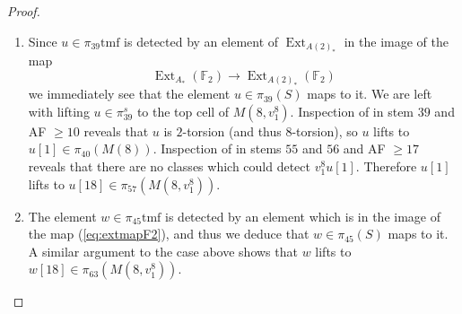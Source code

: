 \documentclass[10pt]{amsart}
\newcommand{\td}[1]{\widetilde{#1}}
\newcommand{\FF}{\mathbb{F}}
\newcommand{\tmf}{\mathrm{tmf}}
\theoremstyle{definition}
\numberwithin{equation}{section}
\numberwithin{figure}{section}
\DeclareMathOperator{\Ext}{Ext}
\begin{document}
\begin{proof}
\begin{enumerate}
The elements $\Delta h_1 h_3 \in \Ext_{A_*}(\FF_2)$ and $v_2^4c_0 \in \Ext_{A(2)_*}(\FF_2)$ are $h_0$-torsion, and hence lift to elements
\begin{align*}
 \Delta h_1 h_3[1] \in \Ext_{A_*}(H(8)), \\
 v_2^4 c_0[1] \in \Ext_{A(2)_*}(H(8))
 \end{align*}
which detect $\td{q}[1] \in \pi_{33}M(8)$ and $q[1] \in \tmf_{33}M(8)$, respectively, in the MASS. To identify the elements which detect $\td{q}[18]$ and $q[18]$ in the MASS, 
we make use of the Geometric Boundary Theorem \cite[Appendix~A]{goodehp}.\footnote{We are specifically using case $(5)$ of the Geometric Boundary Theorem since the relevant class (denoted $p_*(y)$ in the theorem statement) is a permanent cycle.  We will be using this argument repeatedly in subsequent proofs in this section, and for brevity will simply say ``by the Geometric Boundary Theorem...'' in these subsequent instances.}
The differentials
\begin{align*}
 d_3(v_1^2 h_{2,1}g^2[1]) & = v_1^8 \Delta h_3 h_1[1], \\
 d_4(v_1^2 h_{2,1}g^2[1]) & = v_1^8 v_2^4 c_0[1]
 \end{align*}
in the MASS's for $M(8)$ and $\tmf \wedge M(8)$, respectively, imply that $\td{q}[18] \in \pi_{50}M(8,v_1^8)$ and $q[18] \in \tmf_{50}M(8,v_1^8)$ are detected by 
\begin{align*}
v_1^2 h_{2,1}g^2[1] & \in \Ext_{A_*}(H(8,v_1^8)), \\
v_1^2 h_{2,1}g^2[1] & \in \Ext_{A(2)_*}(H(8,v_1^8)),
\end{align*}
in the MASS's for $M(8,v_1^8)$ and $\tmf \wedge M(8,v_1^8)$, respectively, and the former maps to the latter under the map (\ref{eq:extmap}).
\vspace{10pt}

\item Since $u \in \pi_{39}\tmf$ is detected by an element of $\Ext_{A(2)_*}$ in the image of the map
\begin{equation}\label{eq:extmapF2}
 \Ext_{A_*}(\FF_2) \rightarrow \Ext_{A(2)_*}(\FF_2)
\end{equation}
 we immediately see that the element $u \in \pi_{39}(S)$ maps to it. We are left with lifting $u \in \pi^s_{39}$ to the top cell of $M(8,v_1^8)$.  Inspection of \cite[Pg. 3]{IsaksenChart} in stem $39$ and AF $ \geq 10$ reveals that $u$ is $2$-torsion (and thus $8$-torsion), so $u$ lifts to $u[1] \in \pi_{40}(M(8))$. Inspection of \cite[Pg. 3]{IsaksenChart} in stems $55$ and $56$ and AF $\geq 17$ reveals that there are no classes which could detect $v_1^8 u[1]$. Therefore $u[1]$ lifts to $u[18] \in \pi_{57}(M(8,v_1^8))$. 
\vspace{10pt}

\item The element $w \in \pi_{45}\tmf$ is detected by an element which is in the image of the map (\ref{eq:extmapF2}), and thus we deduce that $w \in \pi_{45}(S)$ maps to it.  A similar argument to the case above shows that $w$ lifts to $w[18] \in \pi_{63}(M(8,v_1^8))$. 

\end{enumerate}
\end{proof}
\end{document}
